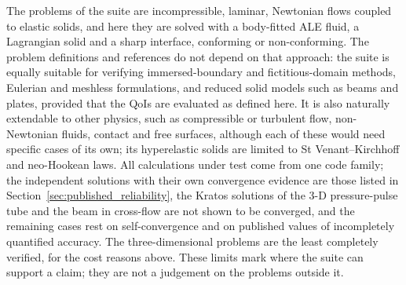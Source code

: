 The problems of the suite are incompressible, laminar, Newtonian flows coupled to elastic solids, and here they are solved with a body-fitted ALE fluid, a Lagrangian solid and a sharp interface, conforming or non-conforming.
The problem definitions and references do not depend on that approach: the suite is equally suitable for verifying immersed-boundary and fictitious-domain methods, Eulerian and meshless formulations, and reduced solid models such as beams and plates, provided that the QoIs are evaluated as defined here.
It is also naturally extendable to other physics, such as compressible or turbulent flow, non-Newtonian fluids, contact and free surfaces, although each of these would need specific cases of its own; its hyperelastic solids are limited to St Venant--Kirchhoff and neo-Hookean laws.
All calculations under test come from one code family; the independent solutions with their own convergence evidence are those listed in Section~\ref{sec:published_reliability}, the Kratos solutions of the 3-D pressure-pulse tube and the beam in cross-flow are not shown to be converged, and the remaining cases rest on self-convergence and on published values of incompletely quantified accuracy.
The three-dimensional problems are the least completely verified, for the cost reasons above.
These limits mark where the suite can support a claim; they are not a judgement on the problems outside it.
